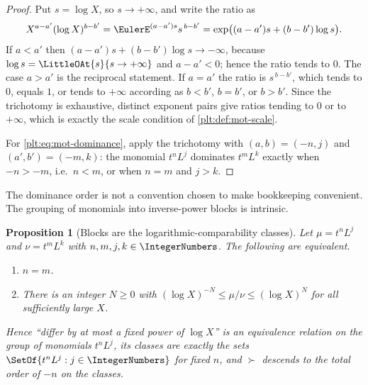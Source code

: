 \documentclass[11pt,oneside]{article}
\theoremstyle{plain}
\newtheorem{proposition}[theorem]{Proposition}
\theoremstyle{definition}
\theoremstyle{remark}
\newcommand{\succdom}{\succ}
\begin{document}
\begin{proof}
Put \(s=\log X\), so \(s\to+\infty\), and write the ratio as
\[
  X^{a-a'}(\log X)^{b-b'}=\EulerE^{(a-a')s}s^{\,b-b'}
  =\exp\bigl((a-a')s+(b-b')\log s\bigr).
\]
If \(a<a'\) then \((a-a')s+(b-b')\log s\to-\infty\), because
\(\log s=\LittleOAt{s}{s\to+\infty}\) and \(a-a'<0\); hence the ratio tends to
\(0\).  The case \(a>a'\) is the reciprocal statement.  If \(a=a'\) the ratio
is \(s^{\,b-b'}\), which tends to \(0\), equals \(1\), or tends to
\(+\infty\) according as \(b<b'\), \(b=b'\), or \(b>b'\).  Since the trichotomy
is exhaustive, distinct exponent pairs give ratios tending to \(0\) or to
\(+\infty\), which is exactly the scale condition of
\cref{plt:def:mot-scale}.

For \eqref{plt:eq:mot-dominance}, apply the trichotomy with \((a,b)=(-n,j)\)
and \((a',b')=(-m,k)\): the monomial \(t^{n}L^{j}\) dominates \(t^{m}L^{k}\)
exactly when \(-n>-m\), i.e.\ \(n<m\), or when \(n=m\) and \(j>k\).
\end{proof}

The dominance order is not a convention chosen to make bookkeeping convenient.
The grouping of monomials into inverse-power blocks is intrinsic.

\begin{proposition}[Blocks are the logarithmic-comparability classes]
\label{plt:prop:mot-blocks}
Let \(\mu=t^{n}L^{j}\) and \(\nu=t^{m}L^{k}\) with
\(n,m,j,k\in\IntegerNumbers\).  The following are equivalent.
\begin{enumerate}
\item \(n=m\).
\item There is an integer \(N\ge0\) with
  \((\log X)^{-N}\le\mu/\nu\le(\log X)^{N}\) for all sufficiently large \(X\).
\end{enumerate}
Hence ``differ by at most a fixed power of \(\log X\)'' is an equivalence
relation on the group of monomials \(t^{n}L^{j}\), its classes are exactly the
sets \(\SetOf{t^{n}L^{j}:j\in\IntegerNumbers}\) for fixed \(n\), and
\(\succdom\) descends to the total order of \(-n\) on the classes.
\end{proposition}
\end{document}
